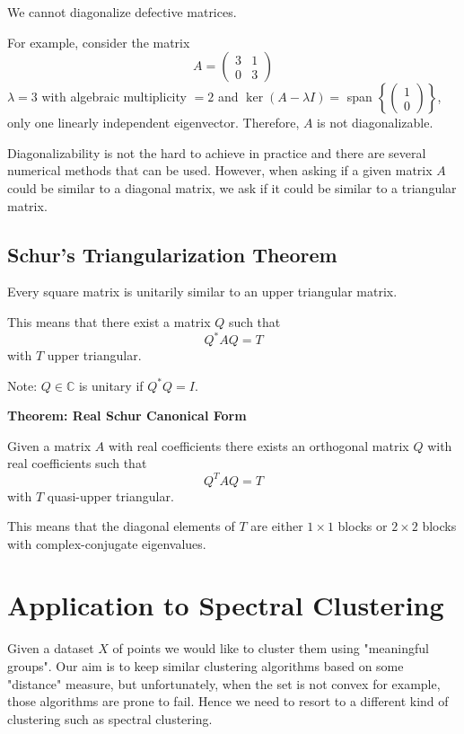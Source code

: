 We cannot diagonalize defective matrices.

For example, consider the matrix
\[
A = \begin{pmatrix}
3 & 1 \\
0 & 3 
\end{pmatrix}
\]
\( \lambda = 3 \) with algebraic multiplicity \( = 2 \) and \( \ker(A - \lambda I) = \) span \( \left\{ \begin{pmatrix} 1 \\ 0 \end{pmatrix} \right\} \), only one linearly independent eigenvector. Therefore, \( A \) is not diagonalizable.

Diagonalizability is not the hard to achieve in practice and there are several numerical methods that can be used. However, when asking if a given matrix \( A \) could be similar to a diagonal matrix, we ask if it could be similar to a triangular matrix.

\subsection{Schur's Triangularization Theorem}

Every square matrix is unitarily similar to an upper triangular matrix.

This means that there exist a matrix \( Q \) such that 
\[ Q^*AQ = T \]
with \( T \) upper triangular.

Note: \( Q \in \mathbb{C} \) is unitary if \( Q^*Q = I \).

\textbf{Theorem: Real Schur Canonical Form}

Given a matrix \( A \) with real coefficients there exists an orthogonal matrix \( Q \) with real coefficients such that
\[ Q^T AQ = T \]
with \( T \) quasi-upper triangular.

This means that the diagonal elements of \( T \) are either \( 1 \times 1 \) blocks or \( 2 \times 2 \) blocks with complex-conjugate eigenvalues.

\section{Application to Spectral Clustering}

Given a dataset \( X \) of points we would like to cluster them using "meaningful groups". Our aim is to keep similar clustering algorithms based on some "distance" measure, but unfortunately, when the set is not convex for example, those algorithms are prone to fail. Hence we need to resort to a different kind of clustering such as spectral clustering.

